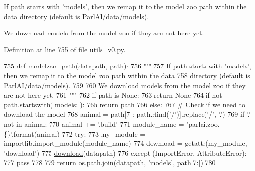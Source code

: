 \begin{DoxyVerb}If path starts with 'models', then we remap it to the model zoo path within the data
directory (default is ParlAI/data/models).

We download models from the model zoo if they are not here yet.
\end{DoxyVerb}
 

Definition at line 755 of file utils\+\_\+v0.\+py.


\begin{DoxyCode}
755 \textcolor{keyword}{def }\hyperlink{namespaceparlai_1_1agents_1_1legacy__agents_1_1seq2seq_1_1utils__v0_a5fbd3301b67f00d6d146fb01c7cd7626}{modelzoo\_path}(datapath, path):
756     \textcolor{stringliteral}{"""}
757 \textcolor{stringliteral}{    If path starts with 'models', then we remap it to the model zoo path within the data}
758 \textcolor{stringliteral}{    directory (default is ParlAI/data/models).}
759 \textcolor{stringliteral}{}
760 \textcolor{stringliteral}{    We download models from the model zoo if they are not here yet.}
761 \textcolor{stringliteral}{    """}
762     \textcolor{keywordflow}{if} path \textcolor{keywordflow}{is} \textcolor{keywordtype}{None}:
763         \textcolor{keywordflow}{return} \textcolor{keywordtype}{None}
764     \textcolor{keywordflow}{if} \textcolor{keywordflow}{not} path.startswith(\textcolor{stringliteral}{'models:'}):
765         \textcolor{keywordflow}{return} path
766     \textcolor{keywordflow}{else}:
767         \textcolor{comment}{# Check if we need to download the model}
768         animal = path[7 : path.rfind(\textcolor{stringliteral}{'/'})].replace(\textcolor{stringliteral}{'/'}, \textcolor{stringliteral}{'.'})
769         \textcolor{keywordflow}{if} \textcolor{stringliteral}{'.'} \textcolor{keywordflow}{not} \textcolor{keywordflow}{in} animal:
770             animal += \textcolor{stringliteral}{'.build'}
771         module\_name = \textcolor{stringliteral}{'parlai.zoo.\{\}'}.\hyperlink{namespaceparlai_1_1chat__service_1_1services_1_1messenger_1_1shared__utils_a32e2e2022b824fbaf80c747160b52a76}{format}(animal)
772         \textcolor{keywordflow}{try}:
773             my\_module = importlib.import\_module(module\_name)
774             download = getattr(my\_module, \textcolor{stringliteral}{'download'})
775             \hyperlink{namespaceparlai_1_1core_1_1build__data_ab74f0e428f05e5d91fa93c8afb367622}{download}(datapath)
776         \textcolor{keywordflow}{except} (ImportError, AttributeError):
777             \textcolor{keywordflow}{pass}
778 
779         \textcolor{keywordflow}{return} os.path.join(datapath, \textcolor{stringliteral}{'models'}, path[7:])
780 \end{DoxyCode}
\mbox{\label{namespaceparlai_1_1agents_1_1legacy__agents_1_1seq2seq_1_1utils__v0_af377ec61bfc0423461e7b409ffc883b9}} 
